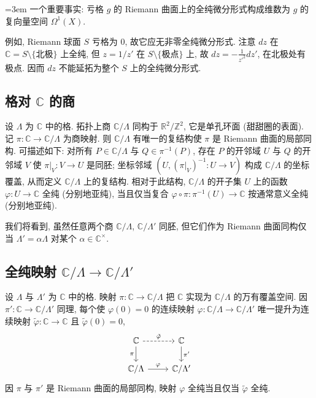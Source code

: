 {\emergencystretch=3em 一个重要事实: 亏格 $g$ 的 Riemann 曲面上的全纯微分形式构成维数为 $g$ 的复向量空间 $\Omega^1(X)$.\par}

例如, Riemann 球面 $S$ 亏格为 $0$, 故它应无非零全纯微分形式. 注意 $dz$ 在 $\mathbb{C} = S\setminus\{\text{北极}\}$ 上全纯, 但 $z = 1/z'$ 在 $S\setminus\{\text{极点}\}$ 上, 故 $dz = -\frac{1}{z'^2}dz'$, 在北极处有极点. 因而 $dz$ 不能延拓为整个 $S$ 上的全纯微分形式.

\subsection*{格对 $\mathbb{C}$ 的商}

设 $\Lambda$ 为 $\mathbb{C}$ 中的格. 拓扑上商 $\mathbb{C}/\Lambda$ 同构于 $\mathbb{R}^2/\mathbb{Z}^2$, 它是单孔环面 (甜甜圈的表面). 记 $\pi\colon\mathbb{C}\to\mathbb{C}/\Lambda$ 为商映射. 则 $\mathbb{C}/\Lambda$ 有唯一的复结构使 $\pi$ 是 Riemann 曲面的局部同构. 可描述如下: 对所有 $P\in\mathbb{C}/\Lambda$ 与 $Q\in\pi^{-1}(P)$, 存在 $P$ 的开邻域 $U$ 与 $Q$ 的开邻域 $V$ 使 $\pi|_V\colon V\to U$ 是同胚; 坐标邻域 $(U, (\pi|_V)^{-1}\colon U\to V)$ 构成 $\mathbb{C}/\Lambda$ 的坐标覆盖, 从而定义 $\mathbb{C}/\Lambda$ 上的复结构. 相对于此结构, $\mathbb{C}/\Lambda$ 的开子集 $U$ 上的函数 $\varphi\colon U\to\mathbb{C}$ 全纯 (分别地亚纯), 当且仅当复合 $\varphi\circ\pi\colon\pi^{-1}(U)\to\mathbb{C}$ 按通常意义全纯 (分别地亚纯).

我们将看到, 虽然任意两个商 $\mathbb{C}/\Lambda$, $\mathbb{C}/\Lambda'$ 同胚, 但它们作为 Riemann 曲面同构仅当 $\Lambda' = \alpha\Lambda$ 对某个 $\alpha\in\mathbb{C}^{\times}$.

\subsection*{全纯映射 $\mathbb{C}/\Lambda\to\mathbb{C}/\Lambda'$}

设 $\Lambda$ 与 $\Lambda'$ 为 $\mathbb{C}$ 中的格. 映射 $\pi\colon\mathbb{C}\to\mathbb{C}/\Lambda$ 把 $\mathbb{C}$ 实现为 $\mathbb{C}/\Lambda$ 的万有覆盖空间. 因 $\pi'\colon\mathbb{C}\to\mathbb{C}/\Lambda'$ 同理, 每个使 $\varphi(0) = 0$ 的连续映射 $\varphi\colon\mathbb{C}/\Lambda\to\mathbb{C}/\Lambda'$ 唯一提升为连续映射 $\tilde{\varphi}\colon\mathbb{C}\to\mathbb{C}$ 且 $\tilde{\varphi}(0) = 0$,
\[\begin{tikzcd}
	\CC & \CC \\
	{\CC/\Lambda} & {\CC/\Lambda'}
	\arrow["{\tilde\varphi}", dashed, from=1-1, to=1-2]
	\arrow["\pi"', from=1-1, to=2-1]
	\arrow["{\pi'}", from=1-2, to=2-2]
	\arrow["\varphi", from=2-1, to=2-2]
\end{tikzcd}\]
因 $\pi$ 与 $\pi'$ 是 Riemann 曲面的局部同构, 映射 $\varphi$ 全纯当且仅当 $\tilde{\varphi}$ 全纯.

